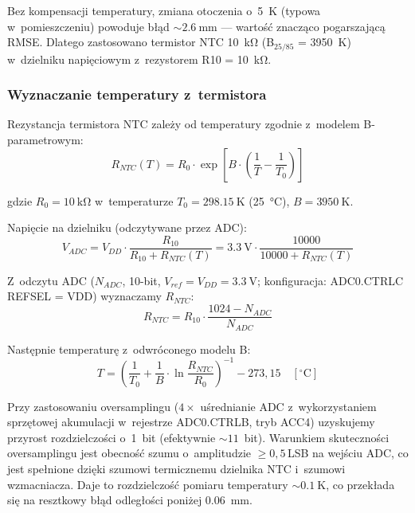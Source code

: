 \documentclass[a4paper,11pt]{article}
\begin{document}
	Bez kompensacji temperatury, zmiana otoczenia o~\SI{5}{\kelvin} (typowa
	w~pomieszczeniu) powoduje błąd ${\sim}\SI{2,6}{\milli\metre}$ --- wartość
	znacząco pogarszającą RMSE. Dlatego zastosowano termistor NTC \SI{10}{\kilo\ohm}
	(B$_{25/85}$ = \SI{3950}{\kelvin}) w~dzielniku napięciowym z~rezystorem
	R10 = \SI{10}{\kilo\ohm}.
	
	\subsubsection{Wyznaczanie temperatury z~termistora}
	
	Rezystancja termistora NTC zależy od temperatury zgodnie z~modelem
	B-parametrowym:
	\begin{equation}
		R_{NTC}(T) = R_0 \cdot \exp\!\left[B \cdot \left(\frac{1}{T} - \frac{1}{T_0}\right)\right]
		\label{eq:ntc_model}
	\end{equation}
	
	gdzie $R_0 = \SI{10}{\kilo\ohm}$ w~temperaturze $T_0 = \SI{298,15}{\kelvin}$
	(\SI{25}{\celsius}), $B = \SI{3950}{\kelvin}$.
	
	Napięcie na dzielniku (odczytywane przez ADC):
	\begin{equation}
		V_{ADC} = V_{DD} \cdot \frac{R_{10}}{R_{10} + R_{NTC}(T)} = \SI{3,3}{\volt} \cdot \frac{10000}{10000 + R_{NTC}(T)}
		\label{eq:dzielnik_ntc}
	\end{equation}
	
	Z~odczytu ADC ($N_{ADC}$, 10-bit, $V_{ref} = V_{DD} = \SI{3,3}{\volt}$;
	konfiguracja: ADC0.CTRLC REFSEL = VDD) wyznaczamy
	$R_{NTC}$:
	\begin{equation}
		R_{NTC} = R_{10} \cdot \frac{1024 - N_{ADC}}{N_{ADC}}
		\label{eq:rntc_z_adc}
	\end{equation}
	
	Następnie temperaturę z~odwróconego modelu B:
	\begin{equation}
		T = \left(\frac{1}{T_0} + \frac{1}{B} \cdot \ln\frac{R_{NTC}}{R_0}\right)^{-1} - 273{,}15 \quad [^\circ\text{C}]
		\label{eq:steinhart}
	\end{equation}
	
	Przy zastosowaniu oversamplingu ($4\times$ uśrednianie ADC z~wykorzystaniem
	sprzętowej akumulacji w~rejestrze ADC0.CTRLB, tryb ACC4) uzyskujemy
	przyrost rozdzielczości o~1~bit (efektywnie ${\sim}11$~bit). Warunkiem
	skuteczności oversamplingu jest obecność szumu o~amplitudzie $\geq 0{,}5$\,LSB
	na wejściu ADC, co jest spełnione dzięki szumowi termicznemu dzielnika
	NTC i~szumowi wzmacniacza. Daje to rozdzielczość pomiaru temperatury
	${\sim}\SI{0,1}{\kelvin}$, co przekłada się na resztkowy błąd odległości poniżej
	\SI{0,06}{\milli\metre}.
	
\end{document}
